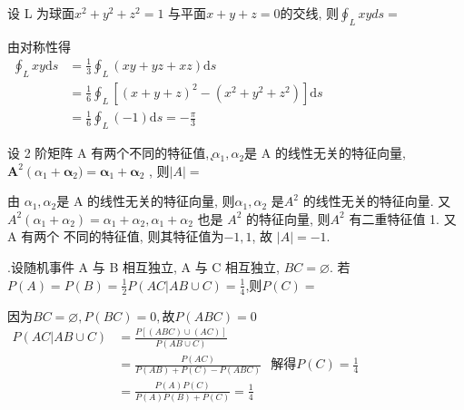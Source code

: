 \documentclass[kindlepaper]{BHCexam4kindle}
\begin{document}
\begin{questions}
		\qs	设 L 为球面$x^{2}+y^{2}+z^{2}=1$ 与平面$x+y+z=0$的交线, 则$\oint_{L} x y d s=$\tk
		\begin{solution}
			由对称性得\\
		$\begin{aligned} \oint_{L} x y \mathrm{d} s &=\frac{1}{3} \oint_{L}(x y+y z+x z) \mathrm{d} s \\ &=\frac{1}{6} \oint_{L}\left[(x+y+z)^{2}-\left(x^{2}+y^{2}+z^{2}\right)\right] \mathrm{d} s \\ &=\frac{1}{6} \oint_{L}(-1) \mathrm{d} s=-\frac{\pi}{3} \end{aligned}$
		\end{solution}

		\qs 设 2 阶矩阵 A 有两个不同的特征值,  ̨$\alpha_{1}, \alpha_{2}$是 A 的线性无关的特征向量,
		$\mathbf{A}^{2}\left(\alpha_{1}+\right.\boldsymbol{\alpha}_{2} )=\boldsymbol{\alpha}_{1}+\boldsymbol{\alpha}_{2}$
		, 则$|A|=$\tk
		\begin{solution}
			由 $\alpha_{1}, \alpha_{2}$是 A 的线性无关的特征向量, 则$\alpha_{1}, \alpha_{2}$ 是$A^{2}$ 的线性无关的特征向量. 又
			$A^{2}\left(\alpha_{1}+\alpha_{2}\right)=\alpha_{1}+\alpha_{2}, \alpha_{1}+\alpha_{2}$
			也是 $A^{2}$ 的特征向量, 则$A^{2}$  有二重特征值 1. 又 A 有两个
			不同的特征值, 则其特征值为$-1,1$, 故 $|A|=-1$.
		\end{solution}

		\qs .设随机事件 A 与 B 相互独立, A 与 C 相互独立, $B C=\varnothing$. 若\\
		$P(A)=P(B)=\frac{1}{2} P(A C | A B \cup C)=\frac{1}{4}$,则$P(C)=$\tk
		\begin{solution}
			因为$B C=\varnothing, P(B C)=0, $故$ P(A B C)=0$\\
		$\begin{aligned} P(A C | A B \cup C) &=\frac{P[(A B C) \cup(A C)]}{P(A B \cup C)} \\ &=\frac{P(A C)}{P(A B)+P(C)-P(A B C)} \\ &=\frac{P(A) P(C)}{P(A) P(B)+P(C)}=\frac{1}{4} \end{aligned}$
			解得$P(C)=\frac{1}{4}$
		\end{solution}


\end{questions}
\end{document}
